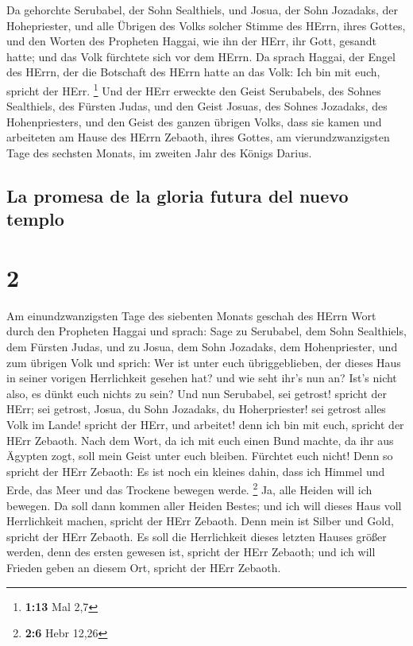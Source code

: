  Da gehorchte Serubabel, der Sohn Sealthiels, und Josua,
der Sohn Jozadaks, der Hohepriester, und alle Übrigen des Volks solcher
Stimme des HErrn, ihres Gottes, und den Worten des Propheten Haggai, wie
ihn der HErr, ihr Gott, gesandt hatte; und das Volk fürchtete sich vor
dem HErrn.  Da sprach Haggai, der Engel des HErrn, der
die Botschaft des HErrn hatte an das Volk: Ich bin mit euch, spricht der
HErr. \footnote{\textbf{1:13} Mal 2,7}  Und der HErr
erweckte den Geist Serubabels, des Sohnes Sealthiels, des Fürsten Judas,
und den Geist Josuas, des Sohnes Jozadaks, des Hohenpriesters, und den
Geist des ganzen übrigen Volks, dass sie kamen und arbeiteten am Hause
des HErrn Zebaoth, ihres Gottes,  am vierundzwanzigsten
Tage des sechsten Monats, im zweiten Jahr des Königs Darius.

\hypertarget{la-promesa-de-la-gloria-futura-del-nuevo-templo}{%
\subsection{La promesa de la gloria futura del nuevo
templo}\label{la-promesa-de-la-gloria-futura-del-nuevo-templo}}

\hypertarget{section-1}{%
\section{2}\label{section-1}}

 Am einundzwanzigsten Tage des siebenten Monats geschah
des HErrn Wort durch den Propheten Haggai und sprach: 
Sage zu Serubabel, dem Sohn Sealthiels, dem Fürsten Judas, und zu Josua,
dem Sohn Jozadaks, dem Hohenpriester, und zum übrigen Volk und sprich:
 Wer ist unter euch übriggeblieben, der dieses Haus in
seiner vorigen Herrlichkeit gesehen hat? und wie seht ihr's nun an?
Ist's nicht also, es dünkt euch nichts zu sein?  Und nun
Serubabel, sei getrost! spricht der HErr; sei getrost, Josua, du Sohn
Jozadaks, du Hoherpriester! sei getrost alles Volk im Lande! spricht der
HErr, und arbeitet! denn ich bin mit euch, spricht der HErr Zebaoth.
 Nach dem Wort, da ich mit euch einen Bund machte, da ihr
aus Ägypten zogt, soll mein Geist unter euch bleiben. Fürchtet euch
nicht!  Denn so spricht der HErr Zebaoth: Es ist noch ein
kleines dahin, dass ich Himmel und Erde, das Meer und das Trockene
bewegen werde. \footnote{\textbf{2:6} Hebr 12,26}  Ja,
alle Heiden will ich bewegen. Da soll dann kommen aller Heiden Bestes;
und ich will dieses Haus voll Herrlichkeit machen, spricht der HErr
Zebaoth.  Denn mein ist Silber und Gold, spricht der HErr
Zebaoth.  Es soll die Herrlichkeit dieses letzten Hauses
größer werden, denn des ersten gewesen ist, spricht der HErr Zebaoth;
und ich will Frieden geben an diesem Ort, spricht der HErr Zebaoth.

